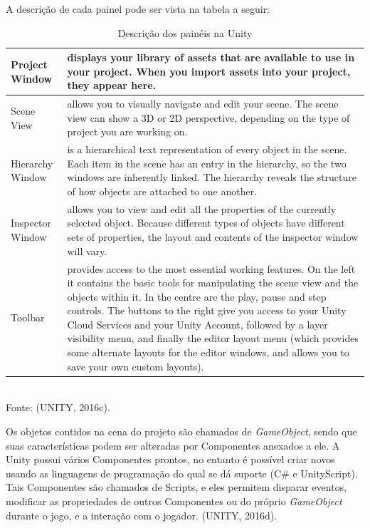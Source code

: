 \documentclass[12pt,a4paper]{article}
\newcommand{\source}[1]{\small Fonte: {#1}}
\begin{document}
			A descrição de cada painel pode ser vista na tabela a seguir:
			
			\begin{table}[ht]
				\label{tabelaUnity}
				\caption{Descrição dos painéis na Unity}
				\centering
				\small
				\begin{tabular}{p{3.5cm} p{11cm}}
					\hline 
					Project Window & displays your library of assets that are available to use in your project. When you import assets into your project, they appear here. \\ 
					\hline 
					Scene View & allows you to visually navigate and edit your scene. The scene view can show a 3D or 2D perspective, depending on the type of project you are working on. \\ 
					\hline 
					Hierarchy Window & is a hierarchical text representation of every object in the scene. Each item in the scene has an entry in the hierarchy, so the two windows are inherently linked. The hierarchy reveals the structure of how objects are attached to one another. \\ 
					\hline 
					Inspector Window & allows you to view and edit all the properties of the currently selected object. Because different types of objects have different sets of properties, the layout and contents of the inspector window will vary. \\ 
					\hline 
					Toolbar & provides access to the most essential working features. On the left it contains the basic tools for manipulating the scene view and the objects within it. In the centre are the play, pause and step controls. The buttons to the right give you access to your Unity Cloud Services and your Unity Account, followed by a layer visibility menu, and finally the editor layout menu (which provides some alternate layouts for the editor windows, and allows you to save your own custom layouts). \\ 
					\hline 
				\end{tabular}\\
				\vspace{3mm}
				\source{(UNITY, 2016c).}
			\end{table}
			
			Os objetos contidos na cena do projeto são chamados de \textit{GameObject},
			sendo que suas características podem ser alteradas por Componentes anexados a ele.
			A Unity possui vários Componentes prontos,
			no entanto é possível criar novos usando as linguagens de programação do qual se dá suporte (C\# e UnityScript).
			Tais Componentes são chamados de Scripts,
			e eles permitem disparar eventos,
			modificar as propriedades de outros Componentes ou do próprio \textit{GameObject} durante o jogo,
			e a interação com o jogador.
			(UNITY, 2016d).
\end{document}
